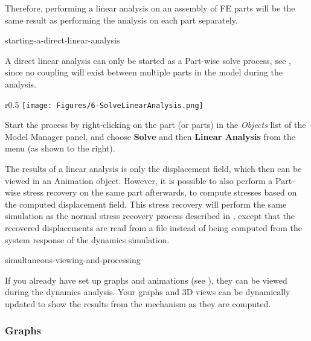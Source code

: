 {Therefore, performing a linear analysis on an assembly of FE parts will be the
same result as performing the analysis on each part separately.


           {starting-a-direct-linear-analysis}

A direct linear analysis can only be started as a Part-wise solve process, see
, since
no coupling will exist between multiple parts in the model during the analysis.

\begin{wrapfigure}[16]{r}{0.5\textwidth}
  \texttt{[image: Figures/6-SolveLinearAnalysis.png]}
\end{wrapfigure}

Start the process by right-clicking on the part (or parts) in the {\sl Objects}
list of the Model Manager panel, and choose \textbf{Solve} and then
\textbf{Linear Analysis} from the menu (as shown to the right).

The results of a linear analysis is only the displacement field, which then can
be viewed in an Animation object. However, it is possible to also perform
a Part-wise stress recovery on the same part afterwards, to compute stresses
based on the computed displacement field. This stress recovery will perform the
same simulation as the normal stress recovery process described in
,
except that the recovered displacements are read from a file instead of being
computed from the system response of the dynamics simulation.




           {simultaneous-viewing-and-processing}

If you already have set up graphs and animations (see
),
they can be viewed during the dynamics analysis.
Your graphs and 3D views can be dynamically updated to show the results from the
mechanism as they are computed.

\subsubsection{Graphs}

}
